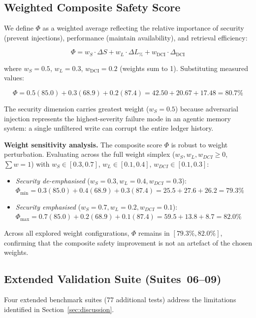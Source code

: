 \documentclass[11pt,twocolumn]{article}
\begin{document}
\subsection{Weighted Composite Safety Score}

We define $\Phi$ as a weighted average reflecting the relative
importance of security (prevent injections), performance (maintain
availability), and retrieval efficiency:

\begin{equation}
  \Phi = w_S \cdot \Delta S + w_L \cdot \Delta L_{\%}
       + w_\text{DCI} \cdot \Delta_\text{DCI}
  \label{eq:phi}
\end{equation}

where $w_S = 0.5$, $w_L = 0.3$, $w_\text{DCI} = 0.2$
(weights sum to 1). Substituting measured values:

\[
  \Phi = 0.5(85.0) + 0.3(68.9) + 0.2(87.4)
       = 42.50 + 20.67 + 17.48 = \mathbf{80.7\%}
\]

The security dimension carries greatest weight ($w_S = 0.5$) because
adversarial injection represents the highest-severity failure mode in
an agentic memory system: a single unfiltered write can corrupt the
entire ledger history.

\textbf{Weight sensitivity analysis.}
The composite score $\Phi$ is robust to weight perturbation.
Evaluating across the full weight simplex ($w_S, w_L, w_{DCI} \geq 0$,
$\sum w = 1$) with $w_S \in [0.3, 0.7]$, $w_L \in [0.1, 0.4]$,
$w_{DCI} \in [0.1, 0.3]$:
\begin{itemize}[leftmargin=*]
  \item \emph{Security de-emphasised}
    ($w_S{=}0.3, w_L{=}0.4, w_{DCI}{=}0.3$):
    $\Phi_{\min} = 0.3(85.0)+0.4(68.9)+0.3(87.4)
    = 25.5+27.6+26.2 = \mathbf{79.3\%}$
  \item \emph{Security emphasised}
    ($w_S{=}0.7, w_L{=}0.2, w_{DCI}{=}0.1$):
    $\Phi_{\max} = 0.7(85.0)+0.2(68.9)+0.1(87.4)
    = 59.5+13.8+8.7 = \mathbf{82.0\%}$
\end{itemize}
Across all explored weight configurations, $\Phi$ remains in
$[79.3\%, 82.0\%]$, confirming that the composite safety improvement
is not an artefact of the chosen weights.

\subsection{Extended Validation Suite (Suites~06--09)}
\label{sec:extended}

Four extended benchmark suites (77 additional tests) address the
limitations identified in Section~\ref{sec:discussion}.
\end{document}
